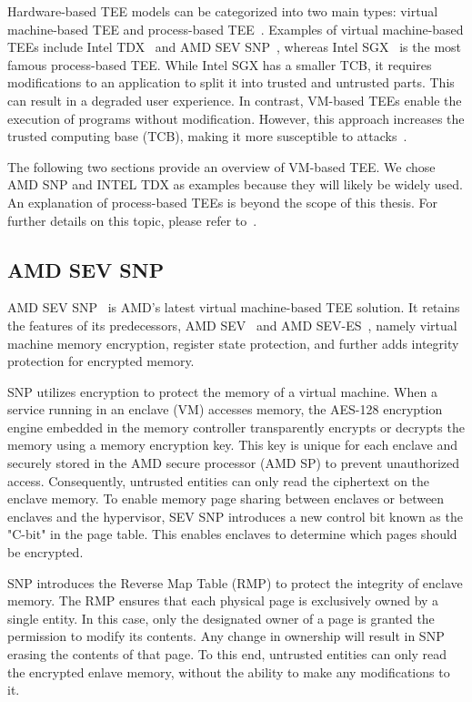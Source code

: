 Hardware-based TEE models can be categorized into two main types: virtual machine-based TEE and process-based TEE~\cite*{10.3389/fcomp.2022.930741}. Examples of virtual machine-based TEEs include Intel TDX~\cite*{Intel_tdx_whitepaper} and AMD SEV SNP~\cite*{SEV_SNP_white_book}, whereas Intel SGX~\cite*{INTEL_SGX} is the most famous process-based TEE. 
While Intel SGX has a smaller TCB, it requires modifications to an application to split it into trusted and untrusted parts. This can result in a degraded user experience. In contrast, VM-based TEEs enable the execution of programs without modification. However, this approach increases the 
trusted computing base (TCB), making it more susceptible to attacks~\cite*{Execution_Environment_landscape}.

The following two sections provide an overview of VM-based TEE. We chose AMD SNP and INTEL TDX as examples because they will likely be widely used. An explanation of process-based TEEs is beyond the scope of this thesis. For further details on this topic, please refer to~\cite*{cryptoeprint:2016/086, 10.1145/2487726.2488370}.


\subsection{AMD SEV SNP}

AMD SEV SNP~\cite*{SEV_SNP_white_book} is AMD's latest virtual machine-based TEE solution. It retains the features of its predecessors, AMD SEV~\cite*{sev} and AMD SEV-ES~\cite*{sev_es}, namely virtual machine memory encryption, register state protection, and further adds integrity protection for 
encrypted memory.


SNP utilizes encryption to protect the memory of a virtual machine. When a service running in an enclave (VM) accesses memory, the AES-128 encryption engine embedded in the memory controller transparently encrypts or decrypts the memory using a memory encryption key.  This key is unique for each 
enclave and securely stored in the AMD secure processor (AMD SP) to prevent unauthorized access. Consequently, untrusted entities can only read the ciphertext on the enclave memory. To enable memory page sharing between enclaves or between enclaves and the hypervisor, SEV SNP introduces a new 
control bit known as the "C-bit" in the page table. This enables enclaves to determine which pages should be encrypted.


SNP introduces the Reverse Map Table (RMP) to protect the integrity of enclave memory. The RMP ensures that each physical page is exclusively owned by a single entity. In this case, only the designated owner of a page is granted the permission to modify its contents. Any change in ownership 
will result in SNP erasing the contents of that page. To this end, untrusted entities can only read the encrypted enlave memory, without the ability to make any modifications to it.

